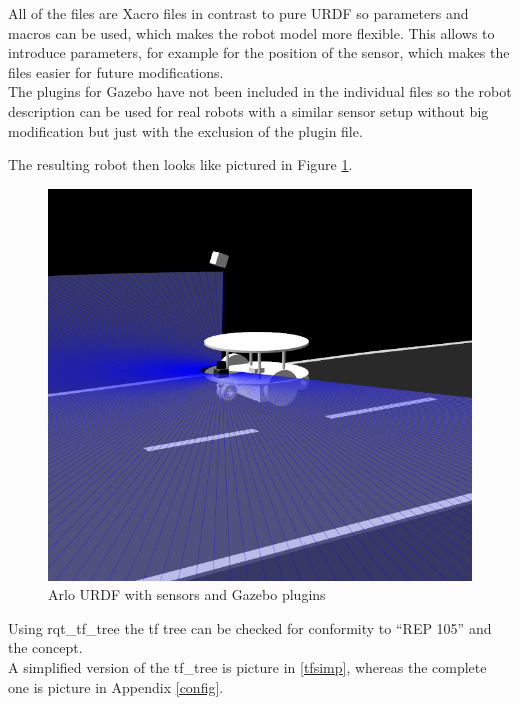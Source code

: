 All of the files are Xacro files in contrast to pure URDF so parameters and macros can be used, which makes the robot model more flexible. This allows to introduce parameters, for example for the position of the sensor, which makes the files easier for future modifications.\\

The plugins for Gazebo have not been included in the individual files so the robot description can be used for real robots with a similar sensor setup without big modification but just with the exclusion of the plugin file.

The resulting robot then looks like pictured in Figure \ref{arlourdf}.

\begin{figure} 
	\includegraphics[width=\textwidth]{Pictures/arlourdf}
	\caption{Arlo URDF with sensors and Gazebo plugins}
	\label{arlourdf}
\end{figure}


Using rqt\_tf\_tree the tf tree can be checked for conformity to ``REP 105'' and the concept.\\ 

A simplified version of the tf\_tree is picture in \ref{tfsimp}, whereas the complete one is picture in Appendix \ref{config}.\\

